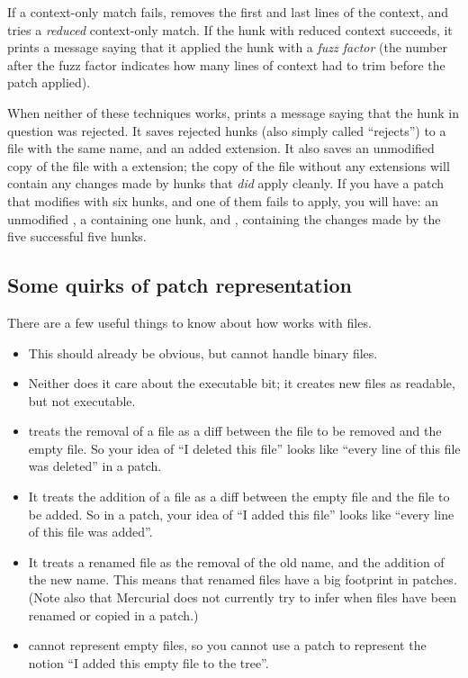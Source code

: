If a context-only match fails,  removes the first and
last lines of the context, and tries a \emph{reduced} context-only
match.  If the hunk with reduced context succeeds, it prints a message
saying that it applied the hunk with a \emph{fuzz factor} (the number
after the fuzz factor indicates how many lines of context
 had to trim before the patch applied).

When neither of these techniques works,  prints a
message saying that the hunk in question was rejected.  It saves
rejected hunks (also simply called ``rejects'') to a file with the
same name, and an added  extension.  It also saves an
unmodified copy of the file with a  extension; the
copy of the file without any extensions will contain any changes made
by hunks that \emph{did} apply cleanly.  If you have a patch that
modifies  with six hunks, and one of them fails to
apply, you will have: an unmodified , a
 containing one hunk, and , containing
the changes made by the five successful five hunks.

\subsection{Some quirks of patch representation}

There are a few useful things to know about how  works
with files.
\begin{itemize}
\item This should already be obvious, but  cannot
  handle binary files.
\item Neither does it care about the executable bit; it creates new
  files as readable, but not executable.
\item {} treats the removal of a file as a diff between
  the file to be removed and the empty file.  So your idea of ``I
  deleted this file'' looks like ``every line of this file was
  deleted'' in a patch.
\item It treats the addition of a file as a diff between the empty
  file and the file to be added.  So in a patch, your idea of ``I
  added this file'' looks like ``every line of this file was added''.
\item It treats a renamed file as the removal of the old name, and the
  addition of the new name.  This means that renamed files have a big
  footprint in patches.  (Note also that Mercurial does not currently
  try to infer when files have been renamed or copied in a patch.)
\item {} cannot represent empty files, so you cannot use
  a patch to represent the notion ``I added this empty file to the
  tree''.
\end{itemize}
